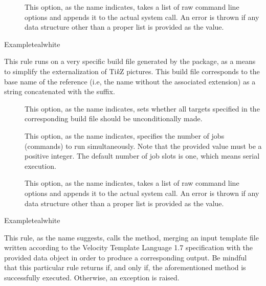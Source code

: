 \begin{description}
\begin{description}
\item[] This option, as the name indicates, takes a list of raw command line options and appends it to the actual system call. An error is thrown if any data structure other than a proper list is provided as the value.
\end{description}

\begin{codebox}{Example}{teal}{\icnote}{white}
\end{codebox}

\item[\rulebox{tikzmake}{Robbie Smith, Paulo Cereda}] This rule runs  on a very specific build file generated by the  package, as a means to simplify the externalization of Ti{\itshape k}Z pictures. This build file corresponds to the base name of the  reference (i.e, the name without the associated extension) as a string concatenated with the  suffix.

\begin{description}
\item[] This option, as the name indicates, sets whether all targets specified in the corresponding build file should be unconditionally made.

\item[] This option, as the name indicates, specifies the number of jobs (commands) to run simultaneously. Note that the provided value must be a positive integer. The default number of job slots is one, which means serial execution.

\item[] This option, as the name indicates, takes a list of raw command line options and appends it to the actual system call. An error is thrown if any data structure other than a proper list is provided as the value.
\end{description}

\begin{codebox}{Example}{teal}{\icnote}{white}
\end{codebox}

\item[\rulebox{velocity}{Paulo Cereda}] This rule, as the name suggests, calls the  method, merging an input template file written according to the Velocity Template Language 1.7 specification with the provided  data object in order to produce a corresponding  output. Be mindful that this particular rule returns  if, and only if, the aforementioned method is successfully executed. Otherwise, an exception is raised.


\end{description}
